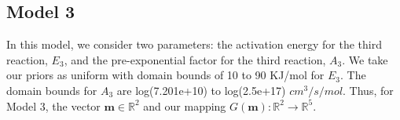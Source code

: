 \subsection{Model 3}


 In this model, we consider two parameters: the activation energy
 for the third reaction, $E_3$, and the pre-exponential factor for the
 third reaction, $A_3$.
 We take our priors
 as uniform with domain bounds of 10 to 90 KJ/mol for $E_3$. The domain bounds for $A_3$ are 
 log(7.201e+10) to log(2.5e+17) $cm^3/s/mol$. 
Thus, for Model 3, the vector
 $\mathbf{m} \in \mathbb{R}^2$ and our mapping $G(\mathbf{m}):
\mathbb{R}^2 \rightarrow \mathbb{R}^5$.












